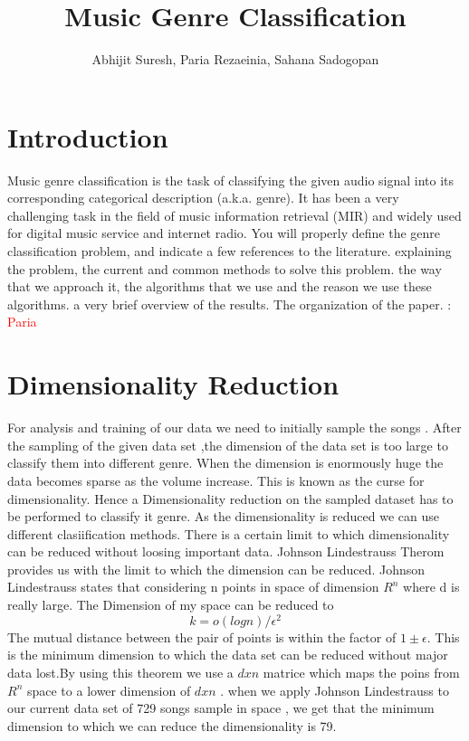 \documentclass[12pt]{article}
\title{Music Genre Classification}
\author{Abhijit Suresh, Paria Rezaeinia, Sahana Sadogopan}
\begin{document}
	\maketitle

\section{Introduction}

Music genre classification is the task of classifying the given audio signal into its corresponding categorical description (a.k.a. genre). It has been a very challenging task in the field of music information retrieval (MIR) and widely used for digital music service and internet radio.
You will properly define the genre classification problem, and
indicate a few references to the literature.
explaining the problem, the current and common methods to solve this problem. the way that we approach it, the algorithms that we use and the reason we use these algorithms. a very brief overview of the results. The organization of the paper. : \textcolor{red}{Paria}
\section{Dimensionality Reduction}\label{dr}
For analysis and training of our data we need to initially sample the songs . After the sampling of the given data set  ,the dimension of the data set is too large to classify them into different genre. When the dimension is enormously huge the data becomes sparse as the volume increase. This is known as the curse for dimensionality. Hence a Dimensionality reduction on the sampled dataset has to be performed to classify it genre. As the dimensionality is reduced we can use different clasiification methods. There is a certain limit to which dimensionality can be reduced without loosing important data. Johnson Lindestrauss Therom provides us with the limit to which the dimension can be reduced.
Johnson Lindestrauss states that considering n points in space of dimension $R^n$  where d is really large. The Dimension of my space can be reduced to $$k=o(log n)/\epsilon^2$$
The mutual distance between the pair of points is within the factor of $1\pm \epsilon$. This is the minimum dimension to which the data set can be reduced without major data lost.By using this theorem we use a $dxn$ matrice which maps the poins from $R^n$ space to a lower dimension of $dxn$ .
when we apply Johnson Lindestrauss to our current data set of 729 songs sample in space , we get that the minimum dimension to which we can reduce the dimensionality is 79.
\end{document}
